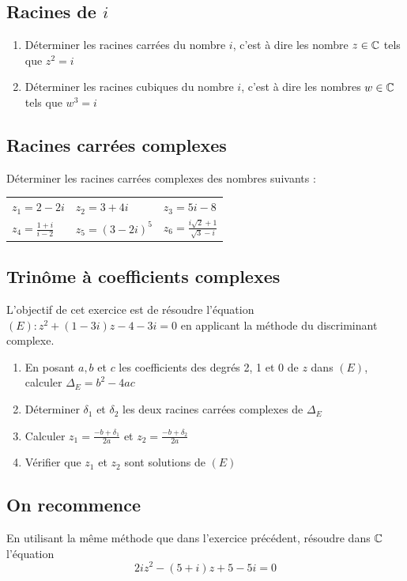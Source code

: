 \documentclass[oneside,12pt]{book}          %
\begin{document}
\subsection{Racines de $i$}
\begin{enumerate}
    \item Déterminer les \og racines carrées \fg du nombre $i$, c'est à dire les nombre ${z\in\mathbb C}$ tels que $z^2=i$
    \item Déterminer les \og racines cubiques \fg du nombre $i$, c'est à dire les nombres $w\in{\mathbb C}$ tels que $w^3=i$
\end{enumerate}



\subsection{Racines carrées complexes}
Déterminer les racines carrées complexes des nombres suivants :

\begin{tabular}{p{} p{}p{}}
    $z_1=2-2i$ & $z_2=3+4i$ & $z_3 = 5i-8$\\
    $z_4=\frac{1+i}{i-2}$ & $z_5=(3-2i)^5$ & $z_6=\frac{i\sqrt{2}+1}{\sqrt{3}-i}$
\end{tabular}



\subsection{Trinôme à coefficients complexes}
L'objectif de cet exercice est de résoudre l'équation $(E):z^2+(1-3i)z-4-3i=0$ en applicant la méthode du discriminant complexe.
\begin{enumerate}
    \item En posant $a,b$ et $c$ les coefficients des degrés 2, 1 et 0 de $z$ dans $(E)$, calculer $\Delta_E=b^2-4ac$
    \item Déterminer $\delta_1$ et $\delta_2$ les deux racines carrées complexes de $\Delta_E$
    \item Calculer $z_1=\frac{-b+\delta_1}{2a}$ et $z_2=\frac{-b+\delta_2}{2a}$
    \item Vérifier que $z_1$ et $z_2$ sont solutions de $(E)$
\end{enumerate}



\subsection{On recommence}
En utilisant la même méthode que dans l'exercice précédent, résoudre dans ${\mathbb C}$ l'équation \[2iz^2-(5+i)z+5-5i=0\]
\end{document}
